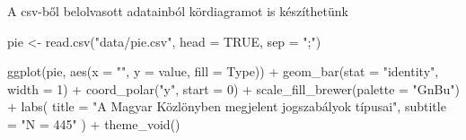 \documentclass[
]{book}
\newenvironment{Shaded}{\begin{snugshade}}{\end{snugshade}}
\newcommand{\AttributeTok}[1]{\textcolor[rgb]{0.77,0.63,0.00}{#1}}
\newcommand{\ConstantTok}[1]{\textcolor[rgb]{0.00,0.00,0.00}{#1}}
\newcommand{\DecValTok}[1]{\textcolor[rgb]{0.00,0.00,0.81}{#1}}
\newcommand{\FunctionTok}[1]{\textcolor[rgb]{0.00,0.00,0.00}{#1}}
\newcommand{\NormalTok}[1]{#1}
\newcommand{\OtherTok}[1]{\textcolor[rgb]{0.56,0.35,0.01}{#1}}
\newcommand{\SpecialCharTok}[1]{\textcolor[rgb]{0.00,0.00,0.00}{#1}}
\newcommand{\StringTok}[1]{\textcolor[rgb]{0.31,0.60,0.02}{#1}}
\begin{document}
A csv-ből belolvasott adatainból kördiagramot is készíthetünk

\begin{Shaded}
\begin{Highlighting}[]
\NormalTok{pie }\OtherTok{\textless{}{-}} \FunctionTok{read.csv}\NormalTok{(}\StringTok{"data/pie.csv"}\NormalTok{, }\AttributeTok{head =} \ConstantTok{TRUE}\NormalTok{, }\AttributeTok{sep =} \StringTok{";"}\NormalTok{)}

\FunctionTok{ggplot}\NormalTok{(pie, }\FunctionTok{aes}\NormalTok{(}\AttributeTok{x =} \StringTok{""}\NormalTok{, }\AttributeTok{y =}\NormalTok{ value, }\AttributeTok{fill =}\NormalTok{ Type)) }\SpecialCharTok{+}
  \FunctionTok{geom\_bar}\NormalTok{(}\AttributeTok{stat =} \StringTok{"identity"}\NormalTok{, }\AttributeTok{width =} \DecValTok{1}\NormalTok{) }\SpecialCharTok{+}
  \FunctionTok{coord\_polar}\NormalTok{(}\StringTok{"y"}\NormalTok{, }\AttributeTok{start =} \DecValTok{0}\NormalTok{) }\SpecialCharTok{+}
  \FunctionTok{scale\_fill\_brewer}\NormalTok{(}\AttributeTok{palette =} \StringTok{"GnBu"}\NormalTok{) }\SpecialCharTok{+}
  \FunctionTok{labs}\NormalTok{(}
    \AttributeTok{title =} \StringTok{"A Magyar Közlönyben megjelent jogszabályok típusai"}\NormalTok{,}
    \AttributeTok{subtitle =} \StringTok{"N = 445"}
\NormalTok{  ) }\SpecialCharTok{+}
  \FunctionTok{theme\_void}\NormalTok{()}
\end{Highlighting}
\end{Shaded}
\end{document}
